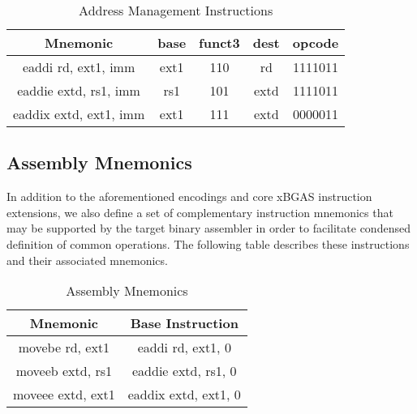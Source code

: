 \documentclass{article}
\begin{document}
\begin{center}
\begin{small}

\begin{table}[H]
\caption{Address Management Instructions}
\begin{center}
\begin{tabular}{| c | c | c | c | c | }
\hline
Mnemonic & base & funct3 & dest & opcode \\ \hline
\hline
eaddi rd, ext1, imm & ext1 & 110 & rd & 1111011\\
\hline
eaddie extd, rs1, imm & rs1 & 101 & extd & 1111011\\
\hline
eaddix extd, ext1, imm & ext1 & 111 & extd & 0000011\\
\hline
\end{tabular}
\end{center}
\end{table}

\end{small}
\end{center}

\subsection{Assembly Mnemonics}

In addition to the aforementioned encodings and core xBGAS 
instruction extensions, we also define a set of complementary 
instruction mnemonics that may be supported by the target 
binary assembler in order to facilitate condensed definition 
of common operations.  The following table describes 
these instructions and their associated mnemonics.  

\begin{center}
\begin{small}

\begin{table}[H]
\caption{Assembly Mnemonics}
\begin{center}
\begin{tabular}{| c | c |}
\hline
Mnemonic & Base Instruction\\ \hline
\hline
movebe rd, ext1 & eaddi rd, ext1, 0\\
\hline
moveeb extd, rs1 & eaddie extd, rs1, 0\\
\hline
moveee extd, ext1 & eaddix extd, ext1, 0\\
\hline
\end{tabular}
\end{center}
\end{table}

\end{small}
\end{center}
\end{document}
